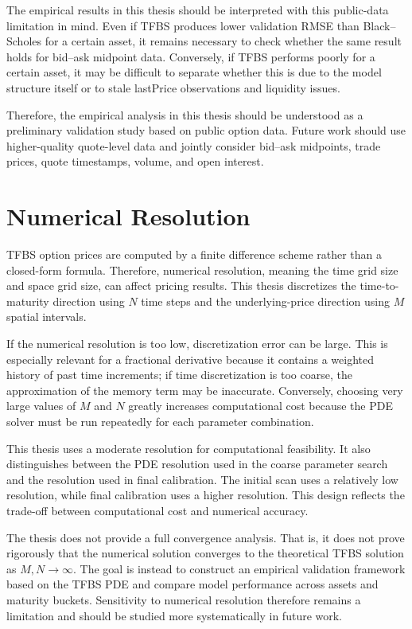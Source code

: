 \documentclass[11pt,a4paper]{report}
\begin{document}
The empirical results in this thesis should be interpreted with this public-data limitation in mind. Even if TFBS produces lower validation RMSE than Black--Scholes for a certain asset, it remains necessary to check whether the same result holds for bid--ask midpoint data. Conversely, if TFBS performs poorly for a certain asset, it may be difficult to separate whether this is due to the model structure itself or to stale lastPrice observations and liquidity issues.

Therefore, the empirical analysis in this thesis should be understood as a preliminary validation study based on public option data. Future work should use higher-quality quote-level data and jointly consider bid--ask midpoints, trade prices, quote timestamps, volume, and open interest.

\section{Numerical Resolution}

TFBS option prices are computed by a finite difference scheme rather than a closed-form formula. Therefore, numerical resolution, meaning the time grid size and space grid size, can affect pricing results. This thesis discretizes the time-to-maturity direction using $N$ time steps and the underlying-price direction using $M$ spatial intervals.

If the numerical resolution is too low, discretization error can be large. This is especially relevant for a fractional derivative because it contains a weighted history of past time increments; if time discretization is too coarse, the approximation of the memory term may be inaccurate. Conversely, choosing very large values of $M$ and $N$ greatly increases computational cost because the PDE solver must be run repeatedly for each parameter combination.

This thesis uses a moderate resolution for computational feasibility. It also distinguishes between the PDE resolution used in the coarse parameter search and the resolution used in final calibration. The initial scan uses a relatively low resolution, while final calibration uses a higher resolution. This design reflects the trade-off between computational cost and numerical accuracy.

The thesis does not provide a full convergence analysis. That is, it does not prove rigorously that the numerical solution converges to the theoretical TFBS solution as $M,N\to\infty$. The goal is instead to construct an empirical validation framework based on the TFBS PDE and compare model performance across assets and maturity buckets. Sensitivity to numerical resolution therefore remains a limitation and should be studied more systematically in future work.
\end{document}
